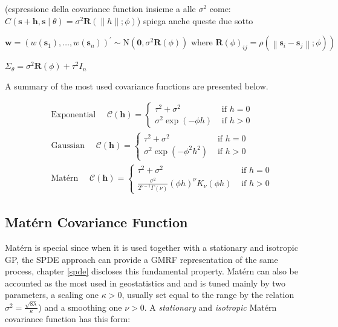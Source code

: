 \documentclass[
  12pt,
  a4paper,
  oneside]{book}
\theoremstyle{definition}
\theoremstyle{definition}
\theoremstyle{definition}
\theoremstyle{remark}
\begin{document}
(espressione della covariance function insieme a alle \(\sigma^2\) come: \(C(\mathbf{s}+\mathbf{h}, \mathbf{s} \mid \theta)=\sigma^{2} \mathbf{R}(\|h\| ; \phi)\))
spiega anche queste due sotto

\[
\mathbf{w}=\left(w\left(\mathbf{s}_{1}\right), \ldots, w\left(\mathbf{s}_{n}\right)\right)^{\prime} \sim \mathrm{N}\left(\mathbf{0}, \sigma^{2} \mathbf{R}(\phi)\right) \text { where } \left.\mathbf{R}(\phi)_{i j}=\rho\left(\left\|\mathbf{s}_{i}-\mathbf{s}_{j}\right\| ; \phi\right)\right)
\]

\(\Sigma_{\theta}=\sigma^{2} \mathbf{R}(\phi)+\tau^{2} I_{n}\)

A summary of the most used covariance functions are presented below.

\[
\begin{aligned}
&\text { Exponential } \quad \mathcal{C}(\mathbf{h})=\left\{\begin{array}{cl}
\tau^{2}+\sigma^{2} & \text { if }  h=0 \\
\sigma^{2} \exp (-\phi h) & \text { if } h>0 
\end{array}\right.\\
&\text { Gaussian } \quad \mathcal{C}(\mathbf{h})=\left\{\begin{array}{cl}
\tau^{2}+\sigma^{2} & \text { if } h=0 \\
\sigma^{2} \exp \left(-\phi^{2} h^{2}\right) & \text { if } h>0 
\end{array}\right. \\
&\text { Matérn } \quad \mathcal{C}(\mathbf{h})=\left\{\begin{array}{cl}
\tau^{2}+\sigma^{2} & \text { if } h=0 \\
\frac{\sigma^{2}}{2^{\nu-1} \Gamma(\nu)}(\phi h)^{\nu} K_{\nu}(\phi h) & \text { if } h>0
\end{array}\right.
\end{aligned}
\]

\hypertarget{Matern}{%
\subsection{Matérn Covariance Function}\label{Matern}}

Matérn is special since when it is used together with a stationary and isotropic GP, the SPDE approach can provide a GMRF representation of the same process, chapter \ref{spde} discloses this fundamental property.
Matérn can also be accounted as the most used in geostatistics \citep{Krainski2018} and \citep{Bayesian_INLA_Rubio} and is tuned mainly by two parameters, a scaling one \(\kappa>0\), usually set equal to the range by the relation \(\sigma^{2}=\frac{\sqrt{8 \lambda}}{\kappa}\)) and a smoothing one \(\nu>0\). A \emph{stationary} and \emph{isotropic} Matérn covariance function has this form:
\end{document}
